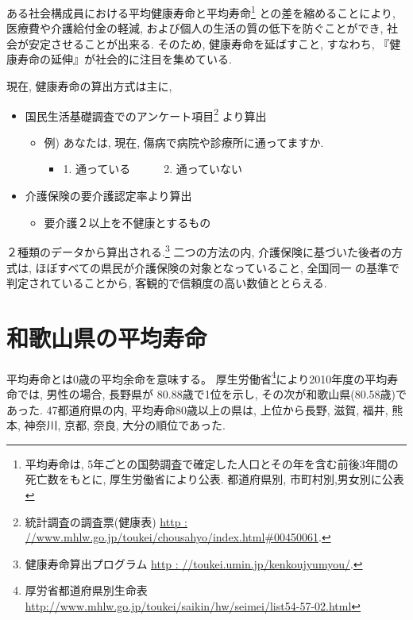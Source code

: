
ある社会構成員における平均健康寿命と平均寿命\footnote{平均寿命は, 5年ごとの国勢調査で確定した人口とその年を含む前後3年間の死亡数をもとに, 厚生労働省により公表. 都道府県別, 市町村別,男女別に公表
}
との差を縮めることにより, 医療費や介護給付金の軽減, および個人の生活の質の低下を防ぐことができ, 社会が安定させることが出来る.
そのため, 健康寿命を延ばすこと, すなわち, 『健康寿命の延伸』が社会的に注目を集めている.
%

現在, 健康寿命の算出方式は主に,
\begin{itemize} \setlength{\itemsep}{-0.5mm} \setlength{\parskip}{-0.5mm}
	\item 国民生活基礎調査でのアンケート項目\footnote{
		      統計調査の調査票(健康表)
		      \url{http : //www.mhlw.go.jp/toukei/chousahyo/index.html#00450061}.
	      }
	      より算出
	      \begin{itemize} \setlength{\itemsep}{-0.5mm} \setlength{\parskip}{-0.5mm}
		      \item 例) あなたは, 現在, 傷病で病院や診療所に通ってますか.
		            \begin{itemize} \setlength{\itemsep}{-0.5mm} \setlength{\parskip}{-0.5mm}
			            \item[] 1. 通っている~~~~~~2. 通っていない
		            \end{itemize}
	      \end{itemize}

	\item 介護保険の要介護認定率より算出
	      \begin{itemize} \setlength{\itemsep}{-0.5mm} \setlength{\parskip}{-0.5mm}
		      \item 要介護２以上を不健康とするもの
	      \end{itemize}
\end{itemize}
２種類のデータから算出される.\footnote{
	健康寿命算出プログラム
	\url{http : //toukei.umin.jp/kenkoujyumyou/}.
}
二つの方法の内, 介護保険に基づいた後者の方式は,
ほぼすべての県民が介護保険の対象となっていること, 全国同一
の基準で判定されていることから, 客観的で信頼度の高い数値ととらえる.

\section{和歌山県の平均寿命}
平均寿命とは0歳の平均余命を意味する。
厚生労働省\footnote{
	厚労省都道府県別生命表
	\url{http://www.mhlw.go.jp/toukei/saikin/hw/seimei/list54-57-02.html}}により2010年度の平均寿命では,
男性の場合, 長野県が 80.88歳で1位を示し, その次が和歌山県(80.58歳)であった. 47都道府県の内, 平均寿命80歳以上の県は,
上位から長野, 滋賀,  福井, 熊本,  神奈川,   京都,   奈良,   大分の順位であった.

